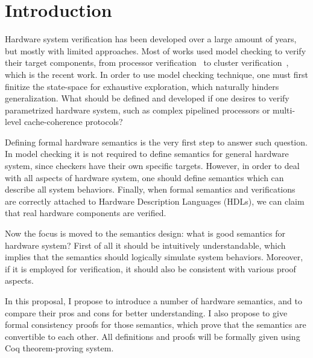 \section{Introduction}

Hardware system verification has been developed over a large amount of
years, but mostly with limited approaches. Most of works used model
checking to verify their target components, from processor
verification~\cite{ProcVerif1, ProcVerif2} to cluster
verification~\cite{ClusterVerif}, which is the recent work. In order
to use model checking technique, one must first finitize the
state-space for exhaustive exploration, which naturally hinders
generalization. What should be defined and developed if one desires to
verify parametrized hardware system, such as complex pipelined
processors or multi-level cache-coherence protocols?

Defining formal hardware semantics is the very first step to answer
such question. In model checking it is not required to define
semantics for general hardware system, since checkers have their own
specific targets. However, in order to deal with all aspects of
hardware system, one should define semantics which can describe all
system behaviors. Finally, when formal semantics and verifications are
correctly attached to Hardware Description Languages (HDLs), we can
claim that real hardware components are verified.

Now the focus is moved to the semantics design: what is good semantics
for hardware system? First of all it should be intuitively
understandable, which implies that the semantics should logically
simulate system behaviors. Moreover, if it is employed for
verification, it should also be consistent with various proof aspects.

In this proposal, I propose to introduce a number of hardware
semantics, and to compare their pros and cons for better
understanding. I also propose to give formal consistency proofs for
those semantics, which prove that the semantics are convertible to
each other. All definitions and proofs will be formally given using
Coq theorem-proving system.

